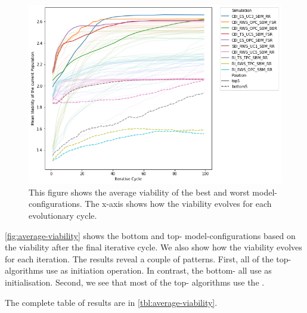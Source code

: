 \documentclass[./../../paper.tex]{subfiles}
\begin{document}
\begin{figure}[htbp]
    \centering
    \includegraphics[width=\textwidth]{figures/generated/exp1_effect_on_viability_top10_last10.png}
    \caption{This figure shows the average viability of the  best and worst model-configurations. The x-axis shows how the viability evolves for each evolutionary cycle.}
    \label{fig:average-viability}
\end{figure}

\noindent \autoref{fig:average-viability} shows the bottom and top- model-configurations based on the viability after the final iterative cycle. We also show how the viability evolves for each iteration. The results reveal a couple of patterns. 
First, all of the top- algorithms use  as initiation operation. In contrast, the bottom- all use  as initialisation. 
Second, we see that most of the top- algorithms use the . 

The complete table of results are in \autoref{tbl:average-viability}.

\end{document}
